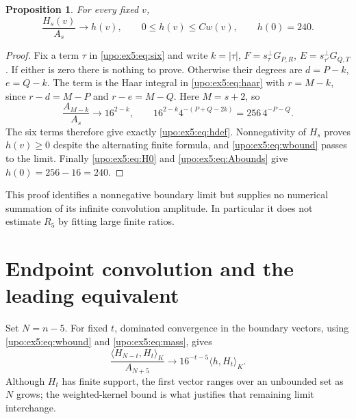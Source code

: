 \documentclass[11pt,letterpaper]{article}
\newtheorem{proposition}[theorem]{Proposition}
\theoremstyle{remark}\newtheorem{remark}[theorem]{Remark}
\numberwithin{equation}{section}
\newcommand{\pair}[2]{\langle #1,#2\rangle_K}
\begin{document}
\begin{proposition}\label{upo:ex5:prop:halflimit}
For every fixed $v$,
\begin{equation}\label{upo:ex5:eq:half-limit}
 \frac{H_s(v)}{A_s}\longrightarrow h(v),
 \qquad 0\le h(v)\le Cw(v),\qquad h(0)=240.
\end{equation}
\end{proposition}
\begin{proof}
Fix a term $\tau$ in \eqref{upo:ex5:eq:six} and write $k=|\tau|$,
$F=s_\tau^\perp G_{P,R}$, $E=s_{\tau'}^\perp G_{Q,T}$.
If either is zero there is nothing to prove. Otherwise their degrees
are $d=P-k$, $e=Q-k$. The term is the Haar integral in
\eqref{upo:ex5:eq:haar} with $r=M-k$, since $r-d=M-P$ and $r-e=M-Q$.
Here $M=s+2$, so
\[
 \frac{A_{M-k}}{A_s}\longrightarrow16^{2-k},
 \qquad
 16^{2-k}4^{-(P+Q-2k)}=256\,4^{-P-Q}.
\]
The six terms therefore give exactly \eqref{upo:ex5:eq:hdef}.
Nonnegativity of $H_s$ proves $h(v)\ge0$ despite the alternating
finite formula, and \eqref{upo:ex5:eq:wbound} passes to the limit.
Finally \eqref{upo:ex5:eq:H0} and \eqref{upo:ex5:eq:Abounds} give
$h(0)=256-16=240$.
\end{proof}

This proof identifies a nonnegative boundary limit but supplies no
numerical summation of its infinite convolution amplitude. In
particular it does not estimate $R_5$ by fitting large finite ratios.

\section{Endpoint convolution and the leading equivalent}\label{upo:ex5:sec:ratio}
Set $N=n-5$. For fixed $t$, dominated convergence in the boundary
vectors, using \eqref{upo:ex5:eq:wbound} and \eqref{upo:ex5:eq:mass}, gives
\begin{equation}\label{upo:ex5:eq:endpoint}
 \frac{\pair{H_{N-t}}{H_t}}{A_{N+5}}
 \longrightarrow16^{-t-5}\pair h{H_t}.
\end{equation}
Although $H_t$ has finite support, the first vector ranges over an
unbounded set as $N$ grows; the weighted-kernel bound is what
justifies that remaining limit interchange.
\end{document}
